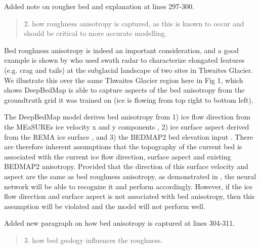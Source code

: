 \documentclass{article}
\begin{document}
{
  \color{ForestGreen}
  Added note on rougher bed and explanation at lines 297-300.
}

\begin{quote}
\color{blue}
  2. how roughness anisotropy is captured, as this is known to occur and should be critical to more accurate modelling.
\end{quote}

Bed roughness anisotropy is indeed an important consideration, and a good example is shown by \citet{HolschuhLinkingpostglaciallandscapes2020} who used swath radar to characterize elongated features (e.g. crag and tails) at the subglacial landscape of two sites in Thwaites Glacier.
We illustrate this over the same Thwaites Glacier region here in Fig 1, which shows DeepBedMap is able to capture aspects of the bed anisotropy from the groundtruth grid it was trained on (ice is flowing from top right to bottom left).

\iffalse
\begin{figure}[htbp]
  \texttt{[image: figure-1\_thwaites\_glacier\_anisotropy.png]}
  \caption{
    Comparison of bed elevation grid products over Thwaites Glacier.
    Top - Groundtruth from gridded Operation IceBridge points.
    Middle - DeepBedMap.
    Bottom - BEDMAP2.
  }
  \label{fig:A}
\end{figure}
\fi

The DeepBedMap model derives bed anisotropy from 1) ice flow direction from the MEaSUREs ice velocity x and y components \citep{MouginotMEaSUREsPhaseMap2019}, 2) ice surface aspect derived from the REMA ice surface \citep{HowatReferenceElevationModel2019}, and 3) the BEDMAP2 bed elevation input \citep{FretwellBedmap2improvedice2013}.
There are therefore inherent assumptions that the topography of the current bed is associated with the current ice flow direction, surface aspect and existing BEDMAP2 anisotropy.
Provided that the direction of this surface velocity and aspect are the same as bed roughness anisotropy, as demonstrated in \citep{HolschuhLinkingpostglaciallandscapes2020}, the neural network will be able to recognize it and perform accordingly.
However, if the ice flow direction and surface aspect is not associated with bed anisotropy, then this assumption will be violated and the model will not perform well.

{
  \color{ForestGreen}
  Added new paragraph on how bed anisotropy is captured at lines 304-311.
}

\begin{quote}
\color{blue}
  3. how bed geology influences the roughness.
\end{quote}
\end{document}
